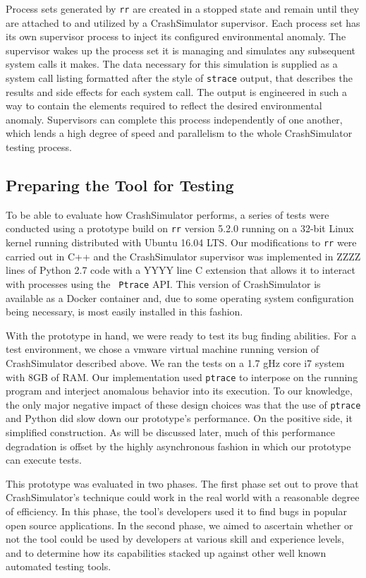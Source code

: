 Process sets generated by {\tt rr} are created in a stopped state and
remain until they are attached to and utilized by a CrashSimulator
supervisor.  Each process set has its own supervisor process to inject
its configured environmental anomaly.  The
supervisor wakes up the process set it is managing and simulates any
subsequent system calls it makes.  The data necessary for this
simulation is
supplied as a system call listing formatted after the style of {\tt strace}
output, that describes the results and side effects for each system
call. The output is engineered in such a way to contain the
elements required to reflect the
desired environmental anomaly.  Supervisors can complete this
process independently of one another, which lends a
high degree of speed and
parallelism to the whole CrashSimulator testing process.

\subsection{Preparing the Tool for Testing}

To be able to evaluate how CrashSimulator performs, a series of tests were
conducted using a prototype build on {\tt rr} version 5.2.0 running on a
32-bit Linux kernel running distributed with  Ubuntu 16.04 LTS.  Our
modifications to {\tt rr} were carried out in C++ and the CrashSimulator
supervisor was implemented in ZZZZ lines of Python 2.7 code with a YYYY
line C extension that allows it to interact with processes using the {\tt
Ptrace} API.  This version of CrashSimulator is available as a Docker
container and, due to some operating system configuration being necessary,
is most easily installed in this fashion.

With the prototype in hand, we were ready to test its bug finding
abilities.  For a test environment, we chose
a vmware virtual machine running version of CrashSimulator described above.
We ran the tests on a 1.7 gHz
core i7 system with 8GB of RAM. Our implementation used {\tt ptrace} to
interpose on the running program and interject anomalous behavior into its
execution.  To our knowledge, the only major negative impact of
these design choices was that the use of {\tt ptrace} and Python did slow
down our
prototype's performance.  On the positive side, it simplified construction.
As will be discussed later, much of this performance
degradation is offset by the highly asynchronous fashion in which our
prototype can execute tests.

This prototype was evaluated in two phases.  The first phase set out to
prove that CrashSimulator's technique could work in the real world with a
reasonable degree of efficiency.  In this phase, the tool's developers used
it to find bugs in popular open source applications.  In the second phase,
we aimed to ascertain whether or not the tool could be used by developers
at various skill and experience levels, and to determine how its
capabilities stacked up against other well known automated testing tools.
